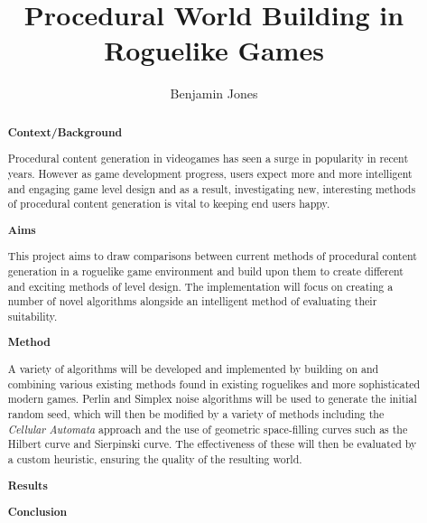 \documentclass[12pt,a4paper]{article}
\title{Procedural World Building in Roguelike Games}
\author{Benjamin Jones}
\date{}
\begin{document}
\maketitle

\begin{abstract}

{\bf Context/Background}

Procedural content generation in videogames has seen a surge in popularity in recent years. However as game development progress, users expect more and more intelligent and engaging game level design and as a result, investigating new, interesting methods of procedural content generation is vital to keeping end users happy.

{\bf Aims}

This project aims to draw comparisons between current methods of procedural content generation in a roguelike game environment and build upon them to create different and exciting methods of level design. The implementation will focus on creating a number of novel algorithms alongside an intelligent method of evaluating their suitability. 

{\bf Method}

A variety of algorithms will be developed and implemented by building on and combining various existing methods found in existing roguelikes and more sophisticated modern games. Perlin and Simplex noise algorithms will be used to generate the initial random seed, which will then be modified by a variety of methods including the \emph{Cellular Automata} approach and the use of geometric space-filling curves such as the Hilbert curve and Sierpinski curve. The effectiveness of these will then be evaluated by a custom heuristic, ensuring the quality of the resulting world. 



{\bf Results}

{\bf Conclusion}

\end{abstract}

\end{document}

